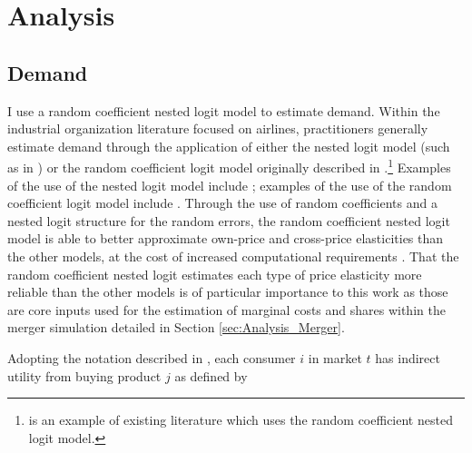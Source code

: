 \documentclass{article}
\begin{document}
	\section{Analysis}
	\label{sec:Analysis} 	 
 	 	 
	\subsection{Demand}
	\label{sec:Analysis_Demand}
	I use a random coefficient nested logit model to estimate demand. Within the industrial organization literature focused on airlines, practitioners generally estimate demand through the application of either the nested logit model (such as in \citet{turner_access_2022,ciliberto_market_2021, aguirregabiria_dynamic_2012}) or the random coefficient logit model originally described in \citet{berry_automobile_1995}.\footnote{\citet{bet_market_2021} is an example of existing literature which uses the random coefficient nested logit model.} Examples of the use of the nested logit model include   \citet{turner_access_2022,ciliberto_market_2021, aguirregabiria_dynamic_2012}; examples of the use of the random coefficient logit model include \citet{ gayle_efficiency_2013, berry_tracing_2010}. Through the use of random coefficients and a nested logit structure for the random errors, the random coefficient nested logit model is able to better approximate own-price and cross-price elasticities than the other models, at the cost of increased computational requirements \citep{grigolon_nested_2014}. That the random coefficient nested logit estimates each type of price elasticity more reliable than the other models is of particular importance to this work as those are core inputs used for the estimation of marginal costs and shares within the merger simulation detailed in Section \ref{sec:Analysis_Merger}. 
    
    Adopting the notation described in \citet{conlon_best_2020}, each consumer $i$ in market $t$ has indirect utility from buying product $j$ as defined by 
	
\end{document}
